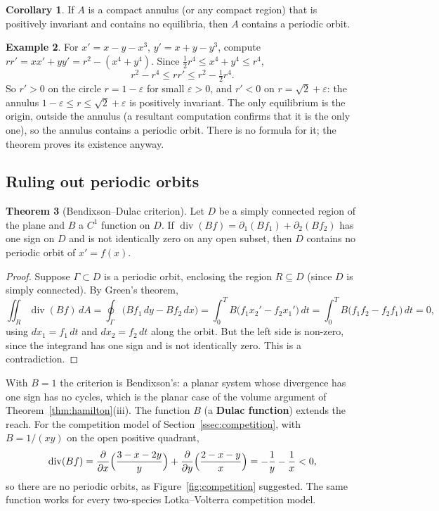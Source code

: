 \documentclass[11pt,a4paper]{article}
\numberwithin{equation}{section}
\theoremstyle{definition}
\newtheorem{thm}{Theorem}[subsection]
\newtheorem{exa}[thm]{Example}
\newtheorem{coro}[thm]{Corollary}
\begin{document}
\begin{coro}
\label{coro:annulus}
If $A$ is a compact annulus (or any compact region) that is positively invariant and contains no equilibria, then $A$ contains a periodic orbit.
\end{coro}

\begin{exa}
\label{ex:annulus}
For $x' = x - y - x^3$, $y' = x + y - y^3$, compute $rr' = xx' + yy' = r^2 - (x^4 + y^4)$. Since $\frac12r^4 \leq x^4 + y^4 \leq r^4$,
\[
r^2 - r^4 \leq rr' \leq r^2 - \tfrac12r^4 .
\]
So $r' > 0$ on the circle $r = 1 - \varepsilon$ for small $\varepsilon > 0$, and $r' < 0$ on $r = \sqrt2 + \varepsilon$: the annulus $1 - \varepsilon \leq r \leq \sqrt2 + \varepsilon$ is positively invariant. The only equilibrium is the origin, outside
the annulus (a resultant computation confirms that it is the only one), so the annulus contains a periodic orbit. There is no formula for it; the theorem proves its existence anyway.
\end{exa}

\subsection{Ruling out periodic orbits}
\label{ssec:dulac}

\begin{thm}[Bendixson--Dulac criterion]
\label{thm:dulac}
Let $D$ be a simply connected region of the plane and $B$ a $C^1$ function on $D$. If $\operatorname{div}(Bf) = \partial_1(Bf_1) + \partial_2(Bf_2)$ has one sign on $D$ and is not identically zero on any open subset, then $D$ contains no
periodic orbit of $x' = f(x)$.
\end{thm}

\begin{proof}
Suppose $\Gamma \subset D$ is a periodic orbit, enclosing the region $R \subseteq D$ (since $D$ is simply connected). By Green's theorem,
\[
\iint_R\operatorname{div}(Bf)\,dA = \oint_\Gamma\bigl(Bf_1\,dy - Bf_2\,dx\bigr) = \int_0^TB\bigl(f_1x_2' - f_2x_1'\bigr)\,dt = \int_0^TB\bigl(f_1f_2 - f_2f_1\bigr)\,dt = 0 ,
\]
using $dx_1 = f_1\,dt$ and $dx_2 = f_2\,dt$ along the orbit. But the left side is non-zero, since the integrand has one sign and is not identically zero. This is a contradiction.
\end{proof}

With $B = 1$ the criterion is Bendixson's: a planar system whose divergence has one sign has no cycles, which is the planar case of the volume argument of Theorem~\ref{thm:hamilton}(iii). The function $B$ (a
\textbf{Dulac function}) extends the reach. For the competition model of Section~\ref{ssec:competition}, with $B = 1/(xy)$ on the open positive quadrant,
\[
\operatorname{div}(Bf) = \frac{\partial}{\partial x}\Bigl(\frac{3 - x - 2y}{y}\Bigr) + \frac{\partial}{\partial y}\Bigl(\frac{2 - x - y}{x}\Bigr) = -\frac1y - \frac1x < 0 ,
\]
so there are no periodic orbits, as Figure~\ref{fig:competition} suggested. The same function works for every two-species Lotka--Volterra competition model.
\end{document}
